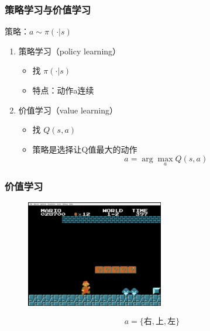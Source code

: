 \documentclass[9pt]{beamer}
\begin{document}
\begin{frame}
\frametitle{策略学习与价值学习}

策略：$a\sim \pi(\cdot|s)$

\vspace{1em}

\begin{enumerate}

\item 策略学习（policy learning）
\begin{itemize}
\item 找 $\pi(\cdot|s)$
\item 特点：动作a连续
\end{itemize}

\pause

\vspace{1em}

\item 价值学习（value learning）
\begin{itemize}
\item 找 $Q(s,a)$
\item 策略是选择让Q值最大的动作
\[
a=\arg\max_a Q(s,a)
\]

\end{itemize}

\end{enumerate}

\end{frame}

\begin{frame}
\frametitle{价值学习}

\begin{figure}
\includegraphics[width=6cm]{../fig/mario.png}
\end{figure}

\[
a=\{\text{右}, \text{上}, \text{左}\}
\]

\end{frame}
\end{document}
